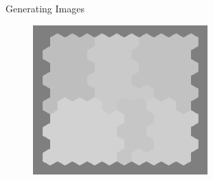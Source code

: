 \documentclass[10pt,xcolor=svgnames]{beamer} %
\begin{document}
\begin{frame}[standout]{Generating Images}
    \begin{figure}
        \centering
        \includegraphics[width=0.6\textwidth]{pictures/grid_init4.png}
    \end{figure}
\end{frame}
\end{document}
